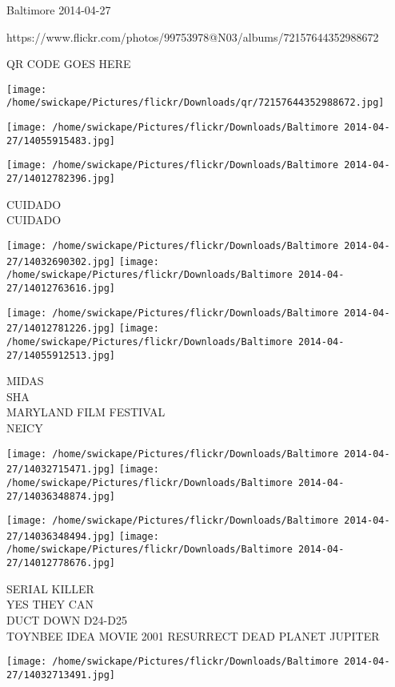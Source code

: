 \documentclass[10pt,letterpaper]{article}
\begin{document}
Baltimore 2014-04-27

https://www.flickr.com/photos/99753978@N03/albums/72157644352988672

QR CODE GOES HERE

\texttt{[image: /home/swickape/Pictures/flickr/Downloads/qr/72157644352988672.jpg]}
\pagebreak

\texttt{[image: /home/swickape/Pictures/flickr/Downloads/Baltimore 2014-04-27/14055915483.jpg]}

\vspace{0.25in}
\texttt{[image: /home/swickape/Pictures/flickr/Downloads/Baltimore 2014-04-27/14012782396.jpg]}

CUIDADO\\
CUIDADO\\
\pagebreak

\texttt{[image: /home/swickape/Pictures/flickr/Downloads/Baltimore 2014-04-27/14032690302.jpg]}
\texttt{[image: /home/swickape/Pictures/flickr/Downloads/Baltimore 2014-04-27/14012763616.jpg]}

\texttt{[image: /home/swickape/Pictures/flickr/Downloads/Baltimore 2014-04-27/14012781226.jpg]}
\texttt{[image: /home/swickape/Pictures/flickr/Downloads/Baltimore 2014-04-27/14055912513.jpg]}

MIDAS\\
SHA\\
MARYLAND FILM FESTIVAL\\
NEICY\\
\pagebreak

\texttt{[image: /home/swickape/Pictures/flickr/Downloads/Baltimore 2014-04-27/14032715471.jpg]}
\texttt{[image: /home/swickape/Pictures/flickr/Downloads/Baltimore 2014-04-27/14036348874.jpg]}

\texttt{[image: /home/swickape/Pictures/flickr/Downloads/Baltimore 2014-04-27/14036348494.jpg]}
\texttt{[image: /home/swickape/Pictures/flickr/Downloads/Baltimore 2014-04-27/14012778676.jpg]}

SERIAL KILLER\\
YES THEY CAN\\
DUCT DOWN D24{-}D25\\
TOYNBEE IDEA MOVIE 2001 RESURRECT DEAD PLANET JUPITER\\
\pagebreak

\texttt{[image: /home/swickape/Pictures/flickr/Downloads/Baltimore 2014-04-27/14032713491.jpg]}
\end{document}
